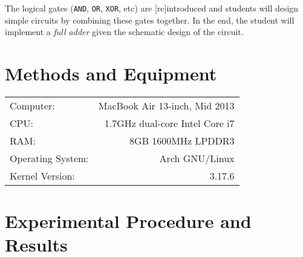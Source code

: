 \documentclass{article}
\begin{document}
The logical gates (\verb$AND$, \verb$OR$, \verb$XOR$, etc) are [re]introduced and students will design simple circuits by combining these gates together.
In the end, the student will implement a \textit{full adder} given the schematic design of the circuit.


\section{Methods and Equipment}

\begin{center}
\begin{tabular}{l r}
Computer: & MacBook Air 13-inch, Mid 2013 \\
CPU: & 1.7GHz dual-core Intel Core i7 \\
RAM: & 8GB 1600MHz LPDDR3 \\
Operating System: & Arch GNU/Linux \\
Kernel Version: & 3.17.6
\end{tabular}
\end{center}


\section{Experimental Procedure and Results}
\end{document}
